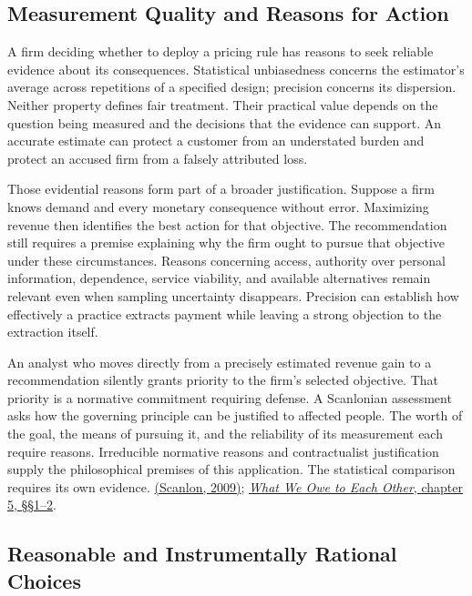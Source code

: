 \hypertarget{M09-measurement-quality-and-reasons-for-action}{%
\subsection{Measurement Quality and Reasons for
Action}\label{M09-measurement-quality-and-reasons-for-action}}

\noindent \noindent A firm deciding whether to deploy a pricing rule has reasons
to seek reliable evidence about its consequences. Statistical
unbiasedness concerns the estimator's average across repetitions of a
specified design; precision concerns its dispersion. Neither property
defines fair treatment. Their practical value depends on the question
being measured and the decisions that the evidence can support. An
accurate estimate can protect a customer from an understated burden and
protect an accused firm from a falsely attributed loss.

Those evidential reasons form part of a broader justification. Suppose a
firm knows demand and every monetary consequence without error.
Maximizing revenue then identifies the best action for that objective.
The recommendation still requires a premise explaining why the firm
ought to pursue that objective under these circumstances. Reasons
concerning access, authority over personal information, dependence,
service viability, and available alternatives remain relevant even when
sampling uncertainty disappears. Precision can establish how effectively
a practice extracts payment while leaving a strong objection to the
extraction itself.

An analyst who moves directly from a precisely estimated revenue gain to
a recommendation silently grants priority to the firm's selected
objective. That priority is a normative commitment requiring defense. A
Scanlonian assessment asks how the governing principle can be justified
to affected people. The worth of the goal, the means of pursuing it, and
the reliability of its measurement each require reasons. Irreducible
normative reasons and contractualist justification supply the
philosophical premises of this application. The statistical comparison
requires its own evidence.
\href{https://media.philosophy.ox.ac.uk/assets/pdf_file/0008/25856/Lecture_2.pdf}{(Scanlon,
2009)};
\href{https://e-edu.nbu.bg/pluginfile.php/314831/mod_resource/content/0/scanlon_5.1-3.pdf}{\emph{What
We Owe to Each Other}, chapter 5, §§1--2}.

\hypertarget{M09-reasonable-and-instrumentally-rational-choices}{%
\subsection{Reasonable and Instrumentally Rational
Choices}\label{M09-reasonable-and-instrumentally-rational-choices}}

